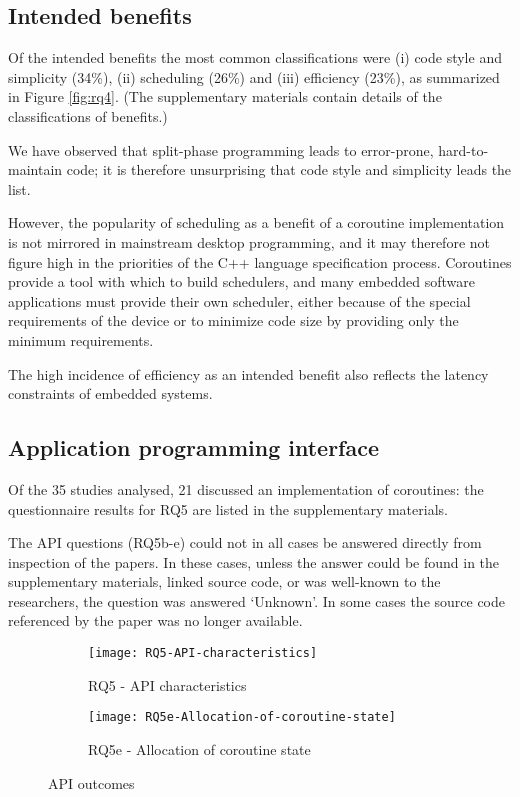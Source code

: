 \subsection{Intended benefits}

Of the intended benefits the most common classifications were (i) code style and simplicity (34\%), (ii) scheduling (26\%) and (iii) efficiency (23\%), as summarized in Figure \ref{fig:rq4}. (The supplementary materials contain details of the classifications of benefits.)

We have observed that split-phase programming leads to error-prone, hard-to-maintain code; it is therefore unsurprising that code style and simplicity leads the list.

However, the popularity of scheduling as a benefit of a coroutine implementation is not mirrored in mainstream desktop programming, and it may therefore not figure high in the priorities of the C++ language specification process. Coroutines provide a tool with which to build schedulers, and many embedded software applications must provide their own scheduler, either because of the special requirements of the device \cite{Inam2011, Park2015, Susilo2009} or to minimize code size by providing only the minimum requirements.

The high incidence of efficiency as an intended benefit also reflects the latency constraints of embedded systems.

\subsection{Application programming interface}

Of the 35 studies analysed, 21 discussed an implementation of coroutines: the questionnaire results for RQ5 are listed in the supplementary materials.

The API questions (RQ5b-e) could not in all cases be answered directly from inspection of the papers. In these cases, unless the answer could be found in the supplementary materials, linked source code, or was well-known to the researchers, the question was answered ‘Unknown’. In some cases the source code referenced by the paper was no longer available.

\begin{figure}[h]
	\centering
	\begin{subfigure}[h]{0.46\textwidth}
		\centering
		\texttt{[image: RQ5-API-characteristics]}
		\caption{RQ5 - API characteristics}
		\label{fig:rq5}
	\end{subfigure}
	\begin{subfigure}[h]{0.46\textwidth}
		\centering
		\texttt{[image: RQ5e-Allocation-of-coroutine-state]}
		\caption{RQ5e - Allocation of coroutine state}
		\label{fig:rq5e}
	\end{subfigure}
	\caption{API outcomes}
\end{figure}

